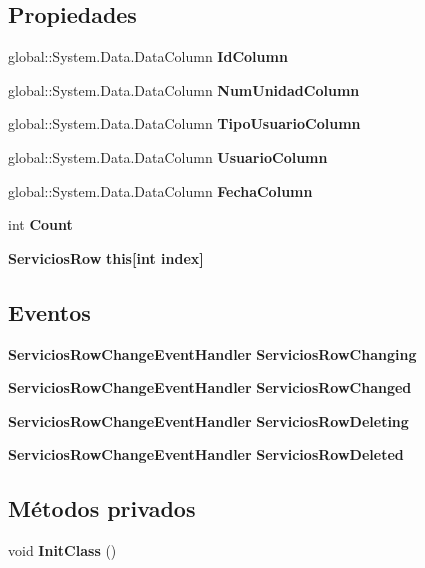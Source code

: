\subsection*{Propiedades}
\begin{DoxyCompactItemize}
\item 
global\-::\-System.\-Data.\-Data\-Column {\bf Id\-Column}\hspace{0.3cm}{\ttfamily  [get]}
\item 
global\-::\-System.\-Data.\-Data\-Column {\bf Num\-Unidad\-Column}\hspace{0.3cm}{\ttfamily  [get]}
\item 
global\-::\-System.\-Data.\-Data\-Column {\bf Tipo\-Usuario\-Column}\hspace{0.3cm}{\ttfamily  [get]}
\item 
global\-::\-System.\-Data.\-Data\-Column {\bf Usuario\-Column}\hspace{0.3cm}{\ttfamily  [get]}
\item 
global\-::\-System.\-Data.\-Data\-Column {\bf Fecha\-Column}\hspace{0.3cm}{\ttfamily  [get]}
\item 
int {\bf Count}\hspace{0.3cm}{\ttfamily  [get]}
\item 
{\bf Servicios\-Row} {\bf this[int index]}\hspace{0.3cm}{\ttfamily  [get]}
\end{DoxyCompactItemize}
\subsection*{Eventos}
\begin{DoxyCompactItemize}
\item 
{\bf Servicios\-Row\-Change\-Event\-Handler} {\bf Servicios\-Row\-Changing}
\item 
{\bf Servicios\-Row\-Change\-Event\-Handler} {\bf Servicios\-Row\-Changed}
\item 
{\bf Servicios\-Row\-Change\-Event\-Handler} {\bf Servicios\-Row\-Deleting}
\item 
{\bf Servicios\-Row\-Change\-Event\-Handler} {\bf Servicios\-Row\-Deleted}
\end{DoxyCompactItemize}
\subsection*{Métodos privados}
\begin{DoxyCompactItemize}
\item 
void {\bf Init\-Class} ()
\end{DoxyCompactItemize}
